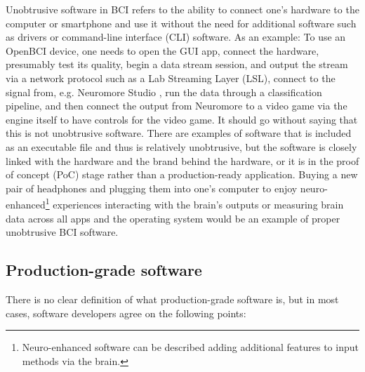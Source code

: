 Unobtrusive software in BCI refers to the ability to connect one's hardware to the computer or smartphone and use it without the need for additional software such as drivers or command-line interface (CLI) software. As an example: To use an OpenBCI device, one needs to open the GUI app, connect the hardware, presumably test its quality, begin a data stream session, and output the stream via a network protocol such as a Lab Streaming Layer (LSL), connect to the signal from, e.g. Neuromore Studio \citep{openbci_neuromore_nodate}, run the data through a classification pipeline, and then connect the output from Neuromore to a video game via the engine itself to have controls for the video game. It should go without saying that this is not unobtrusive software. There are examples of software that is included as an executable file and thus is relatively unobtrusive, but the software is closely linked with the hardware and the brand behind the hardware, or it is in the proof of concept (PoC) stage rather than a production-ready application. Buying a new pair of headphones and plugging them into one's computer to enjoy neuro-enhanced\footnote{Neuro-enhanced software can be described adding additional features to input methods via the brain.} experiences interacting with the brain's outputs or measuring brain data across all apps and the operating system would be an example of proper unobtrusive BCI software.

\subsection{Production-grade software}
\label{chapter2-production-grade-software}

There is no clear definition of what production-grade software is, but in most cases, software developers agree on the following points:

